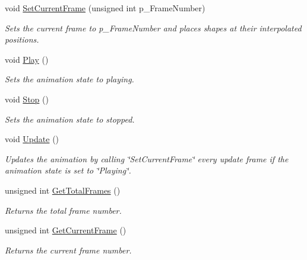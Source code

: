 \begin{DoxyCompactItemize}
\mbox{\label{class_keyframe_manager_a6dd869e79b4e4be340abf62db07c21ae}} 
void \hyperlink{class_keyframe_manager_a6dd869e79b4e4be340abf62db07c21ae}{Set\+Current\+Frame} (unsigned int p\+\_\+\+Frame\+Number)
\begin{DoxyCompactList}\small\item\em Sets the current frame to p\+\_\+\+Frame\+Number and places shapes at their interpolated positions. \end{DoxyCompactList}\item 
\mbox{\label{class_keyframe_manager_a38d18fb54e65492a3682b865c3cf6b53}} 
void \hyperlink{class_keyframe_manager_a38d18fb54e65492a3682b865c3cf6b53}{Play} ()
\begin{DoxyCompactList}\small\item\em Sets the animation state to playing. \end{DoxyCompactList}\item 
\mbox{\label{class_keyframe_manager_a2ca51f9d58c2c346b5cda13ab13f3675}} 
void \hyperlink{class_keyframe_manager_a2ca51f9d58c2c346b5cda13ab13f3675}{Stop} ()
\begin{DoxyCompactList}\small\item\em Sets the animation state to stopped. \end{DoxyCompactList}\item 
\mbox{\label{class_keyframe_manager_affb43ea87dcd581a8938238e275cf1bf}} 
void \hyperlink{class_keyframe_manager_affb43ea87dcd581a8938238e275cf1bf}{Update} ()
\begin{DoxyCompactList}\small\item\em Updates the animation by calling \char`\"{}\+Set\+Current\+Frame\char`\"{} every update frame if the animation state is set to \char`\"{}\+Playing\char`\"{}. \end{DoxyCompactList}\item 
\mbox{\label{class_keyframe_manager_ac94f8f3d7a9c65ee226df806e81d0a90}} 
unsigned int \hyperlink{class_keyframe_manager_ac94f8f3d7a9c65ee226df806e81d0a90}{Get\+Total\+Frames} ()
\begin{DoxyCompactList}\small\item\em Returns the total frame number. \end{DoxyCompactList}\item 
\mbox{\label{class_keyframe_manager_a5aa8a4aba82178223ab869ff3bad0dd3}} 
unsigned int \hyperlink{class_keyframe_manager_a5aa8a4aba82178223ab869ff3bad0dd3}{Get\+Current\+Frame} ()
\begin{DoxyCompactList}\small\item\em Returns the current frame number. \end{DoxyCompactList}\end{DoxyCompactItemize}
